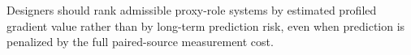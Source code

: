 Designers should rank admissible proxy-role systems by estimated profiled gradient value rather than by long-term prediction risk, even when prediction is penalized by the full paired-source measurement cost.